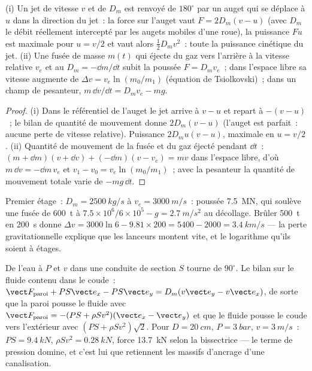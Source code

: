 \begin{proposition}\label{prop:b2:flow-balances:pelton}
(i) Un jet de vitesse $v$ et de  $D_m$ est renvoyé de
$180^\circ$ par un auget qui se déplace à $u$ dans la direction du jet~: la force
sur l'auget vaut $F = 2D_m(v - u)$ (avec $D_m$ le débit réellement
intercepté par les augets mobiles d'une roue), la puissance $Fu$ est
maximale pour $u = v/2$ et vaut alors $\tfrac12D_mv^2$~: toute la puissance
cinétique du jet. (ii) Une fusée de masse $m(t)$ qui éjecte du gaz vers l'arrière à
la vitesse relative $v_e$ et au  $D_m = -\dd m/\dd t$ subit la
poussée $F = D_mv_e$~; dans l'espace libre sa vitesse augmente de
$\Delta v = v_e\ln(m_0/m_1)$ (équation de Tsiolkovski)~; dans un champ de pesanteur,
$m\,\dd v/\dd t = D_mv_e - mg$.
\end{proposition}

\begin{proof}
(i) Dans le référentiel de l'auget le jet arrive à $v - u$ et repart à
$-(v - u)$~; le bilan de quantité de mouvement donne $2D_m(v - u)$ (l'auget est
parfait~: aucune perte de vitesse relative). Puissance $2D_mu(v - u)$, maximale en
$u = v/2$. (ii) Quantité de mouvement de la fusée et du gaz éjecté pendant $\dd t$~: $(m + \dd m)
(v + \dd v) + (-\dd m)(v - v_e) = mv$ dans l'espace libre, d'où $m\,\dd v = -\dd m\,v_e$
et $v_1 - v_0 = v_e\ln(m_0/m_1)$~; avec la pesanteur la quantité de mouvement totale varie
de $-mg\,\dd t$.
\end{proof}

\begin{example}[Un lanceur]\label{ex:b2:flow-balances:rocket}
Premier étage~: $D_m = \qty{2500}{kg/s}$ à $v_e = \qty{3000}{m/s}$~: poussée
\qty{7.5}{MN}, qui soulève une fusée de \qty{600}{t} à $7.5 \times 10^6/6 \times 10^5 - g
= \qty{2.7}{m/s^2}$ au décollage. Brûler \qty{500}{t} en \qty{200}{s} donne
$\Delta v = 3000\ln6 - 9.81 \times 200 = 5400 - 2000 = \qty{3.4}{km/s}$ --- la
perte gravitationnelle explique que les lanceurs montent vite, et le logarithme qu'ils
soient à étages.
\end{example}

\begin{example}\label{ex:b2:flow-balances:bend}
De l'eau à $P$ et $v$ dans une conduite de section $S$ tourne de $90^\circ$. Le
bilan sur le fluide contenu dans le coude~: $\vect F_{\text{paroi}} + PS\vect e_x - PS
\vect e_y = D_m(v\vect e_y - v\vect e_x)$, de sorte que la paroi pousse le fluide avec
$\vect F_{\text{paroi}} = -(PS + \rho Sv^2)(\vect e_x - \vect e_y)$ et que le fluide
pousse le coude vers l'extérieur avec $(PS + \rho Sv^2)\sqrt2$. Pour $D = \qty{20}{cm}$,
$P = \qty{3}{bar}$, $v = \qty{3}{m/s}$~: $PS = \qty{9.4}{kN}$, $\rho Sv^2 = \qty{0.28}{kN}$,
force \qty{13.7}{kN} selon la bissectrice --- le terme de pression domine,
et c'est lui que retiennent les massifs d'ancrage d'une canalisation.
\end{example}

